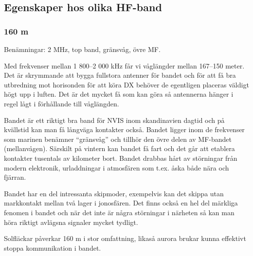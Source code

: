 \subsection{Egenskaper hos olika HF-band}

\subsubsection{160 m}

Benämningar: 2 MHz, top band, gränsvåg, övre MF.

Med frekvenser mellan 1 800--2 000 kHz får vi våglängder mellan 167--150 meter. Det är skrymmande att bygga fullstora antenner för bandet och för att få bra utbredning mot horisonden för att köra DX behöver de egentligen placeras väldigt högt upp i luften. Det är det mycket få som kan göra så antennerna hänger i regel lågt i förhållande till våglängden. 

Bandet är ett riktigt bra band för NVIS inom skandinavien dagtid och på kvällstid kan man få långväga kontakter också. Bandet ligger inom de frekvenser som marinen benämner ``gränsvåg'' och tillhör den övre delen av MF-bandet (mellanvågen).  Särskilt på vintern kan bandet få fart och det går att etablera kontakter tusentals av kilometer bort. Bandet drabbas hårt av störningar från modern elektronik, urladdningar i atmosfären som t.ex. åska både nära och fjärran.

Bandet har en del intressanta skipmoder, exempelvis kan det skippa utan markkontakt mellan två lager i jonosfären. Det finns också en hel del märkliga fenomen i bandet och när det inte är några störningar i närheten så kan man höra riktigt avlägsna signaler mycket tydligt.

Solfläckar påverkar 160 m i stor omfattning, likaså aurora brukar kunna effektivt stoppa kommunikation i bandet.
